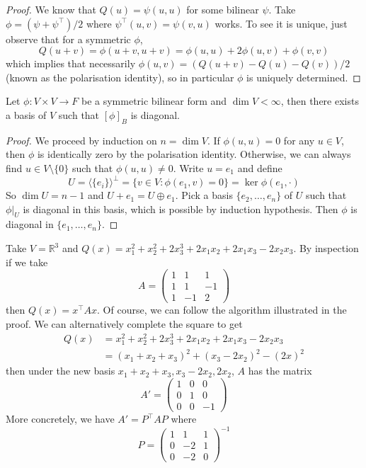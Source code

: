 \begin{proof}
    We know that $Q(u)=\psi(u,u)$ for some bilinear $\psi$.
    Take $\phi=(\psi+\psi^\top)/2$ where $\psi^\top(u,v)=\psi(v,u)$ works.
    To see it is unique, just observe that for a symmetric $\phi$,
    $$Q(u+v)=\phi(u+v,u+v)=\phi(u,u)+2\phi(u,v)+\phi(v,v)$$
    which implies that necessarily $\phi(u,v)=(Q(u+v)-Q(u)-Q(v))/2$ (known as the polarisation identity), so in particular $\phi$ is uniquely determined.
\end{proof}
\begin{theorem}\label{bilinear_diag}
    Let $\phi:V\times V\to F$ be a symmetric bilinear form and $\dim V<\infty$, then there exists a basis of $V$ such that $[\phi]_B$ is diagonal.
\end{theorem}
\begin{proof}
    We proceed by induction on $n=\dim V$.
    If $\phi(u,u)=0$ for any $u\in V$, then $\phi$ is identically zero by the polarisation identity.
    Otherwise, we can always find $u\in V\setminus\{0\}$ such that $\phi(u,u)\neq 0$.
    Write $u=e_1$ and define
    $$U=\langle \{e_i\}\rangle^\perp=\{v\in V:\phi(e_1,v)=0\}=\ker \phi(e_1,\cdot)$$
    So $\dim U=n-1$ and $U+e_1=U\oplus e_1$.
    Pick a basis $\{e_2,\ldots,e_n\}$ of $U$ such that $\phi|_U$ is diagonal in this basis, which is possible by induction hypothesis.
    Then $\phi$ is diagonal in $\{e_1,\ldots,e_n\}$.
\end{proof}
\begin{example}
    Take $V=\mathbb R^3$ and $Q(x)=x_1^2+x_2^2+2x_3^3+2x_1x_2+2x_1x_3-2x_2x_3$.
    By inspection if we take
    $$A=\begin{pmatrix}
        1&1&1\\
        1&1&-1\\
        1&-1&2
    \end{pmatrix}$$
    then $Q(x)=x^\top Ax$.
    Of course, we can follow the algorithm illustrated in the proof.
    We can alternatively complete the square to get
    \begin{align*}
        Q(x)&=x_1^2+x_2^2+2x_3^3+2x_1x_2+2x_1x_3-2x_2x_3\\
        &=(x_1+x_2+x_3)^2+(x_3-2x_2)^2-(2x)^2
    \end{align*}
    then under the new basis $x_1+x_2+x_3,x_3-2x_2,2x_2$, $A$ has the matrix
    $$A'=\begin{pmatrix}
        1&0&0\\
        0&1&0\\
        0&0&-1
    \end{pmatrix}$$
    More concretely, we have $A'=P^\top AP$ where
    $$P=\begin{pmatrix}
        1&1&1\\
        0&-2&1\\
        0&-2&0
    \end{pmatrix}^{-1}$$
\end{example}